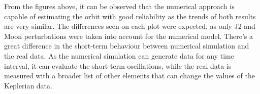 \documentclass{article}
\begin{document}
From the figures above, it can be observed that the numerical approach is capable of estimating the orbit with good reliability as the trends of both results are very similar. The differences seen on each plot were expected, as only J2 and Moon perturbations were taken into account for the numerical model. There’s a great difference in the short-term behaviour between numerical simulation and the real data. As the numerical simulation can generate data for any time interval, it can evaluate the short-term oscillations, while the real data is measured with a broader list of other elements that can change the values of the Keplerian data. 

	
\end{document}
